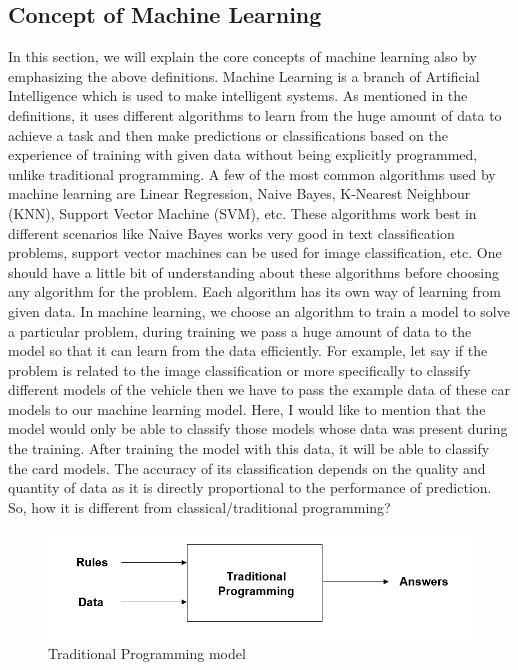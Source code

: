\subsection{Concept of Machine Learning}
In this section, we will explain the core concepts of machine learning also by emphasizing the above definitions. Machine Learning is a branch of Artificial Intelligence \cite{ai} which is used to make intelligent systems. As mentioned in the definitions, it uses different algorithms to learn from the huge amount of data to achieve a task and then make predictions or classifications based on the experience of training with given data without being explicitly programmed, unlike traditional programming. A few of the most common algorithms used by machine learning are Linear Regression, Naive Bayes, K-Nearest Neighbour (KNN), Support Vector Machine (SVM), etc. These algorithms work best in different scenarios like Naive Bayes works very good in text classification problems, support vector machines can be used for image classification, etc. One should have a little bit of understanding about these algorithms before choosing any algorithm for the problem. Each algorithm has its own way of learning from given data. In machine learning, we choose an algorithm to train a model to solve a particular problem, during training we pass a huge amount of data to the model so that it can learn from the data efficiently. For example, let say if the problem is related to the image classification or more specifically to classify different models of the vehicle then we have to pass the example data of these car models to our machine learning model. Here, I would like to mention that the model would only be able to classify those models whose data was present during the training. After training the model with this data, it will be able to classify the card models. The accuracy of its classification depends on the quality and quantity of data as it is directly proportional to the performance of prediction. So, how it is different from classical/traditional programming?
\begin{figure}[H]
\centering
\includegraphics[scale=0.7]{images/Chapter2/TP.PNG}
\caption{Traditional Programming model}
\label{tp-model}
\end{figure}
